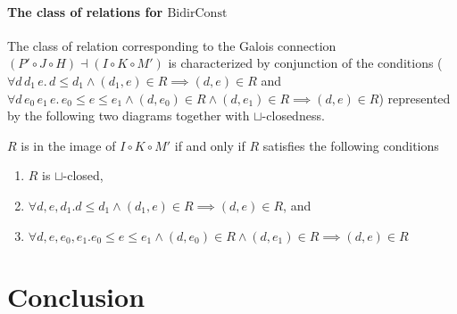\documentclass{llncs}
\newcommand{\UnidirConst}{\mathrm{BidirConst}}
\newcommand{\join}{\sqcup}
\newcommand{\comp}{\circ}
\newcommand{\rotleq}{\rotatebox[origin=c]{90}{$\leq$}}
\begin{document}
  \paragraph{The class of relations for $\UnidirConst$}
  The class of relation corresponding to the Galois connection $(P' \comp J \comp H)  \dashv (I \comp K \comp M')$
  is characterized by conjunction of the conditions
  ($\forall d\, d_{1}\, e.\, d \leq d_{1} \land (d_{1}, e) \in R \implies (d , e) \in R$ and $\forall d\, e_{0}\, e_{1}\, e.\, e_{0} \leq e \leq e_{1} \land (d, e_{0}) \in R \land (d, e_{1}) \in R \implies (d , e) \in R$)
  represented by the following two diagrams together with $\join$-closedness.
  \begin{center}
  \end{center}
  \begin{proposition}\label{prop:predown-postsegment}
    $R$ is in the image of $I \comp K \comp M'$ if and only if $R$ satisfies the following conditions
    \begin{enumerate}[i]
      \item $R$ is $\join$-closed,
      \item $\forall d, e , d_{1}. d \leq d_{1} \land (d_{1} , e) \in R \implies (d , e) \in R$, and
      \item $\forall d, e , e_{0}, e_{1}. e_{0} \leq e \leq e_{1} \land (d , e_{0}) \in R \land (d , e_{1}) \in R \implies (d , e) \in R$
    \end{enumerate}
  \end{proposition}

\section{Conclusion}
\end{document}
